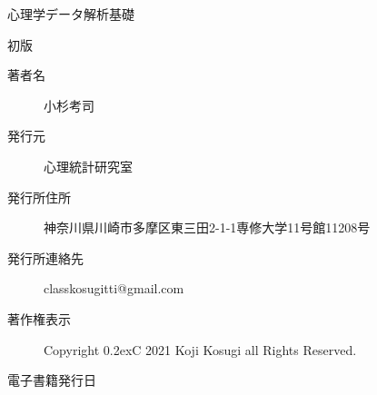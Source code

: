 

\vspace*{20pt}
\begin{center}
    \Large{心理学データ解析基礎}




    \large{初版}

    \vspace*{20pt}

    \begin{description}
        \item[著者名] 小杉考司
        \item[発行元] 心理統計研究室
        \item[発行所住所] 神奈川県川崎市多摩区東三田2-1-1専修大学11号館11208号
        \item[発行所連絡先] classkosugitti@gmail.com
        \item[著作権表示] Copyright \raise0.2ex\hbox{\textcircled{\scriptsize{C}}} 2021 Koji Kosugi all Rights Reserved.
        \item[電子書籍発行日] \date{\today}
    \end{description}
\end{center}

